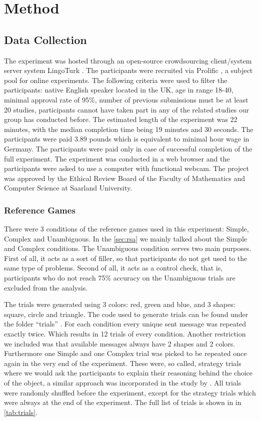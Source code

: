 ﻿\chapter{Method}
\label{chap:method}

\section{Data Collection}
\label{sec:data}
The experiment was hosted through an open-source crowdsourcing client/system server system LingoTurk \citep{lingoturk}.
The participants were recruited via Prolific \citep{prolific}, a subject pool for online experiments. The following criteria were used to filter the participants: native English speaker located in the UK, age in range 18-40, minimal approval rate of 95\%, number of previous submissions must be at least 20 studies, participants cannot have taken part in any of the related studies our group has conducted before. The estimated length of the experiment was 22 minutes, with the median completion time being 19 minutes and 30 seconds. The participants were paid 3.89 pounds which is equivalent to minimal hour wage in Germany. The participants were paid only in case of successful completion of the full experiment. The experiment was conducted in a web browser and the participants were asked to use a computer with functional webcam. The project was approved by the Ethical Review Board of the Faculty of Mathematics and Computer Science at Saarland University.


\subsection{Reference Games}
\label{sec:data:ref_games}
There were 3 conditions of the reference games used in this experiment: Simple, Complex and Unambiguous. In the \autoref{sec:rsa} we mainly talked about the Simple and Complex conditions. The Unambiguous condition serves two main purposes. First of all, it acts as a sort of filler, so that participants do not get used to the same type of problems. Second of all, it acts as a control check, that is, participants who do not reach 75\% accuracy on the Unambiguous trials are excluded from the analysis.

The trials were generated using 3 colors: red, green and blue, and 3 shapes: square, circle and triangle. The code used to generate trials can be found under the folder ``trials'' \citep{github}. For each condition every unique sent message was repeated exactly twice. Which results in 12 trials of every condition. Another restriction we included was that available messages always have 2 shapes and 2 colors. Furthermore one Simple and one Complex trial was picked to be repeated once again in the very end of the experiment. These were, so called, strategy trials where we would ask the participants to explain their reasoning behind the choice of the object, a similar approach was incorporated in the study by \cite{Mayn_2023}. All trials were randomly shuffled before the experiment, except for the strategy trials which were always at the end of the experiment. The full list of trials is shown in in \autoref{tab:trials}. 

